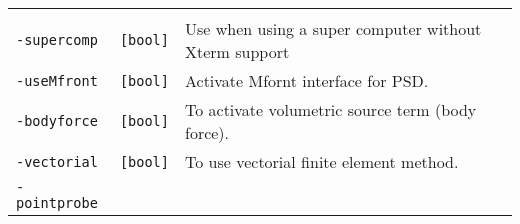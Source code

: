 \begin{longtable}[]{@{}lll@{}}
\begin{minipage}[t]{0.56\columnwidth}
\end{minipage}\tabularnewline
\begin{minipage}[t]{0.26\columnwidth}\raggedright\strut
\lstinline!-supercomp!\strut
\end{minipage} & \begin{minipage}[t]{0.09\columnwidth}\raggedright\strut
\lstinline![bool]!\strut
\end{minipage} & \begin{minipage}[t]{0.56\columnwidth}\raggedright\strut
Use when using a super computer without Xterm support\strut
\end{minipage}\tabularnewline
\begin{minipage}[t]{0.26\columnwidth}\raggedright\strut
\lstinline!-useMfront!\strut
\end{minipage} & \begin{minipage}[t]{0.09\columnwidth}\raggedright\strut
\lstinline![bool]!\strut
\end{minipage} & \begin{minipage}[t]{0.56\columnwidth}\raggedright\strut
Activate Mfornt interface for PSD.\strut
\end{minipage}\tabularnewline
\begin{minipage}[t]{0.26\columnwidth}\raggedright\strut
\lstinline!-bodyforce!\strut
\end{minipage} & \begin{minipage}[t]{0.09\columnwidth}\raggedright\strut
\lstinline![bool]!\strut
\end{minipage} & \begin{minipage}[t]{0.56\columnwidth}\raggedright\strut
To activate volumetric source term (body force).\strut
\end{minipage}\tabularnewline
\begin{minipage}[t]{0.26\columnwidth}\raggedright\strut
\lstinline!-vectorial!\strut
\end{minipage} & \begin{minipage}[t]{0.09\columnwidth}\raggedright\strut
\lstinline![bool]!\strut
\end{minipage} & \begin{minipage}[t]{0.56\columnwidth}\raggedright\strut
To use vectorial finite element method.\strut
\end{minipage}\tabularnewline
\begin{minipage}[t]{0.26\columnwidth}\raggedright\strut
\lstinline!-pointprobe!\strut
\end{minipage} & \begin{minipage}[t]{0.09\columnwidth}\raggedright\strut

\end{minipage}
\end{longtable}
